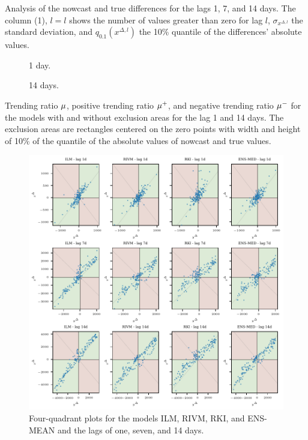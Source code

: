 \begin{table}
    \centering
    
    \caption{Analysis of the nowcast and true differences for the lags 1, 7, and 14 days.
    The column (1), $l=l$ shows the number of values greater than zero for lag $l$, $\sigma_{x^{\Delta, l}}$ the standard deviation, and $q_{0.1} (x^{\Delta, l})$ the 10\% quantile of the differences' absolute values.}
    \label{tab:app-covid-marginals}
\end{table}

\begin{table}
    \centering
    \begin{subfigure}[t]{\textwidth}
        
    \caption{1 day.}
    \end{subfigure}
    \begin{subfigure}[t]{\textwidth}
        
        \caption{14 days.}
    \end{subfigure}
    \caption{Trending ratio $\mu$, positive trending ratio $\mu^+$, and negative trending ratio $\mu^-$ for the models with and without exclusion areas for the lag 1 and 14 days. The exclusion areas are rectangles centered on the zero points with width and height of 10\% of the quantile of the absolute values of nowcast and true values. }
    \label{tab:app-covid-trending-ratios-lag-1-14}
\end{table}



\begin{figure}
\centering
\includegraphics{plots/covid_nowcast/30_4q_plots}
\caption{Four-quadrant plots for the models ILM, RIVM, RKI, and ENS-MEAN and the lags of one, seven, and 14 days. }
\label{fig:app-covid-4q}
\end{figure}


